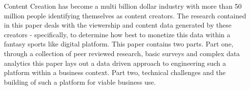 
Content Creation has become a multi billion dollar industry with more than 50 million people \cite{karuza_2022} identifying themselves as content creators.  The research contained in this paper deals with the viewership and content data generated by these creators - specifically, to determine how best to monetize this data within a fantasy sports like digital platform.  This paper contains two parts.  Part one, through a collection of peer reviewed research, basic surveys and complex data analytics this paper lays out a data driven approach to engineering such a platform within a business context.  Part two, technical challenges and the building of such a platform for viable business use.